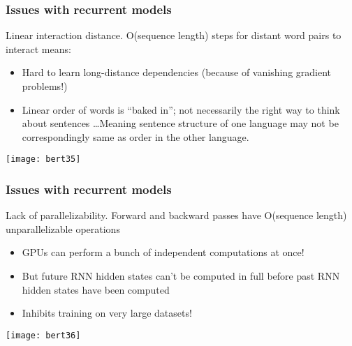 \begin{frame}[fragile]\frametitle{Issues with recurrent models}


Linear interaction distance. O(sequence length) steps for distant word pairs to interact means:

\begin{itemize}
\item Hard to learn long-distance dependencies (because of vanishing gradient problems!)
\item Linear order of words is ``baked in''; not necessarily the  right way to think about sentences \ldots Meaning sentence structure of one language may not be correspondingly same as order in the other language.
\end{itemize}	 

\begin{center}
\texttt{[image: bert35]}
\end{center}	

 
\end{frame}

\begin{frame}[fragile]\frametitle{Issues with recurrent models}

Lack of parallelizability. Forward and backward passes have O(sequence length) unparallelizable operations

\begin{itemize}
\item GPUs can perform a bunch of independent computations at once!
\item But future RNN hidden states can’t be computed in full before past RNN
hidden states have been computed
\item Inhibits training on very large datasets!
\end{itemize}	 

\begin{center}
\texttt{[image: bert36]}
\end{center}	

 
\end{frame}

